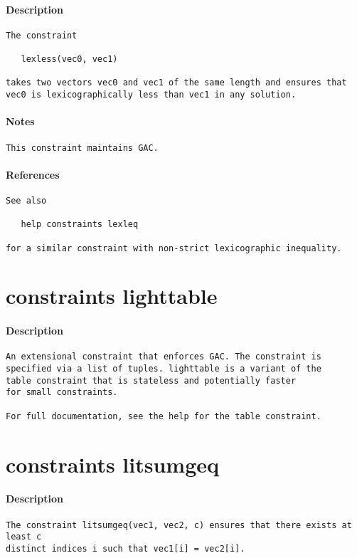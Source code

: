 \paragraph{Description}
{\footnotesize
\begin{verbatim}
The constraint

   lexless(vec0, vec1)

takes two vectors vec0 and vec1 of the same length and ensures that
vec0 is lexicographically less than vec1 in any solution.
\end{verbatim}
}
\paragraph{Notes}
{\footnotesize
\begin{verbatim}
This constraint maintains GAC.
\end{verbatim}
}
\paragraph{References}
{\footnotesize
\begin{verbatim}
See also

   help constraints lexleq

for a similar constraint with non-strict lexicographic inequality.
\end{verbatim}
}
\section{constraints lighttable}
\paragraph{Description}
{\footnotesize
\begin{verbatim}
An extensional constraint that enforces GAC. The constraint is
specified via a list of tuples. lighttable is a variant of the 
table constraint that is stateless and potentially faster
for small constraints.

For full documentation, see the help for the table constraint.
\end{verbatim}
}
\section{constraints litsumgeq}
\paragraph{Description}
{\footnotesize
\begin{verbatim}
The constraint litsumgeq(vec1, vec2, c) ensures that there exists at least c
distinct indices i such that vec1[i] = vec2[i].
\end{verbatim}
}
